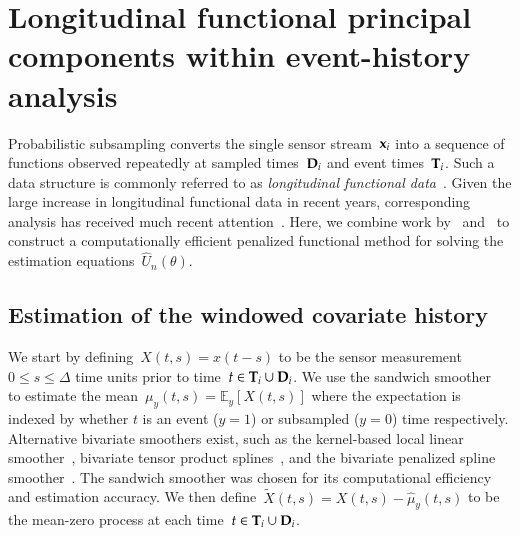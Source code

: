 \documentclass[12pt]{amsart}
\def\E{\mathcal{E}}
\def\E{\mathbb{E}}
\def\bfx{{\bf x}}
\def\bfT{{\bf T}}
\def\bfD{{\bf D}}
\begin{document}
\section{Longitudinal functional principal components within
  event-history analysis}

Probabilistic subsampling converts the single sensor stream~$\bfx_i$ into a sequence of functions observed repeatedly at sampled times~$\bfD_i$ and event times~$\bfT_i$. Such a data structure is commonly referred to as \emph{longitudinal functional data}~\citep{Xiao2013, GoldSmith2015}. Given the large increase in longitudinal functional data in recent years, corresponding analysis has received much recent attention~\citep{Morris2003, MorrisCarroll2006, Baladandayuthapani2008, Di2009, Greven2010, Staicu2010, ChenMuller2012, LiGuan2014}. Here, we combine work by~\cite{Park2018} and~\cite{Goldsmith2011} to construct a computationally efficient penalized functional method for solving the estimation equations~$\hat U_n (\theta)$.

\subsection{Estimation of the windowed covariate history}
\label{sec:margcov}
We start by defining~$X(t,s) = x(t-s)$ to be the sensor measurement~$0 \leq s \leq \Delta$ time units prior to time~$t \in \bfT_i \cup \bfD_i$. We use the sandwich smoother~\citep{Xiao2013} to estimate the mean~$\mu_y(t,s) = \E_y [ X(t,s)]$ where the expectation is indexed by whether $t$ is an event ($y=1$) or subsampled ($y=0$) time respectively. Alternative bivariate smoothers exist, such as the kernel-based local linear smoother~\citep{Hastie2009}, bivariate tensor product splines~\citep{Wood2006}, and the bivariate penalized spline smoother~\citep{MarxEilers2005}. The sandwich smoother was chosen for its computational efficiency and estimation accuracy. We then define~$\tilde X(t,s) = X(t,s) - \hat \mu_y(t,s)$ to be the mean-zero process at each time~$t \in \bfT_i \cup \bfD_i$.
\end{document}

